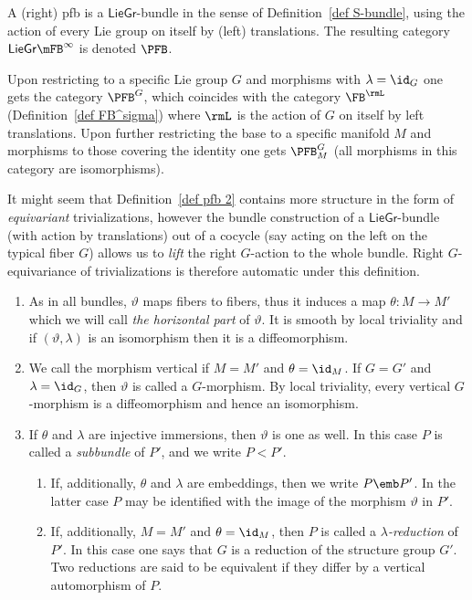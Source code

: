 \begin{defn}\label{def pfb 3}
    A (right) \gls{pfb} is a $\mathsf{LieGr}$-bundle in the sense of Definition~\ref{def S-bundle}, using the action of every Lie group on itself by (left) translations. The resulting category $\mathsf{LieGr}\mFB^\infty$ is denoted $\PFB$. 
    
    Upon restricting to a specific Lie group $G$ and morphisms with $\lambda=\id_G$ one gets the category $\PFB^G$, which coincides with the category $\FB^\rmL$ (Definition~\ref{def FB^sigma}) where $\rmL$ is the action of $G$ on itself by left translations. Upon further restricting the base to a specific manifold $M$ and morphisms to those covering the identity one gets $\PFB^G_M$ (all morphisms in this category are isomorphisms).
\end{defn}

It might seem that Definition~\ref{def pfb 2} contains more structure in the form of \emph{equivariant} trivializations, however the bundle construction of a $\mathsf{LieGr}$-bundle (with action by translations) out of a cocycle (say acting on the left on the typical fiber $G$) allows us to \emph{lift} the right $G$-action to the whole bundle. Right $G$-equivariance of trivializations is therefore automatic under this definition.

\begin{rem}\label{rem 1.1.8 RS2}
    \begin{enumerate}
        \item As in all bundles, $\vartheta$ maps fibers to fibers, thus it induces a map $\theta:M\to M'$ which we will call \emph{the horizontal part} of $\vartheta$. It is smooth by local triviality and if $(\vartheta,\lambda)$ is an isomorphism then it is a diffeomorphism.
        \item We call the morphism vertical if $M=M'$ and $\theta=\id_M$. If $G=G'$ and $\lambda=\id_G$, then $\vartheta$ is called a $G$-morphism. By local triviality, every vertical $G$-morphism is a diffeomorphism and hence an isomorphism.
        \item If $\theta$ and $\lambda$ are injective immersions, then $\vartheta$ is one as well. In this case $P$ is called a \emph{subbundle} of $P'$, and we write $P<P'$.
        \begin{enumerate}
            \item If, additionally, $\theta$ and $\lambda$ are embeddings, then we write $P\emb P'$. In the latter case $P$ may be identified with the image of the morphism $\vartheta$ in $P'$.
            \item If, additionally, $M=M'$ and $\theta=\id_M$, then $P$ is called a \emph{$\lambda$-reduction} of $P'$. In this case one says that $G$ is a reduction of the structure group $G'$. Two reductions are said to be equivalent  if they differ by a vertical automorphism of $P$.
        \end{enumerate}
    \end{enumerate}
\end{rem}

